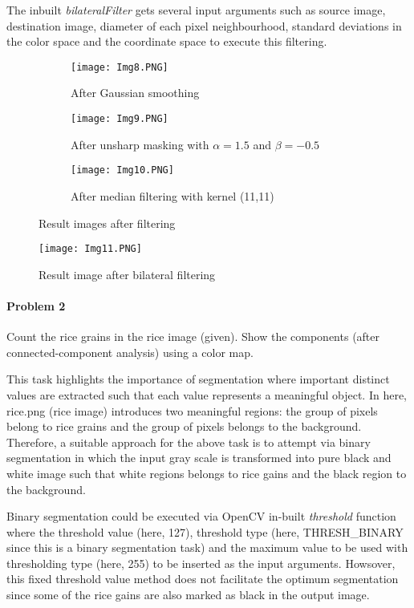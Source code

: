 \documentclass[11pt]{scrartcl}
\begin{document}
{\begin{enumerate}[label=(\alph*)]
The inbuilt \textit{bilateralFilter} gets several input arguments such as source image, destination image, diameter of each pixel neighbourhood, standard deviations in the color space and the coordinate space to execute this filtering.
\begin{figure}
\centering
\begin{subfigure}{.5\textwidth}
  \centering
  \texttt{[image: Img8.PNG]}
  \caption{After Gaussian smoothing}
  \label{fig:sub1}
\end{subfigure}%
\begin{subfigure}{0.5\textwidth}
  \centering
  \texttt{[image: Img9.PNG]}
  \caption{After unsharp masking with $\alpha = 1.5$ and $\beta = -0.5$}
  \label{fig:sub2}
\end{subfigure}
\begin{subfigure}{0.5\textwidth}
  \centering
  \texttt{[image: Img10.PNG]}
  \caption{After median filtering with kernel (11,11)}
  \label{fig:sub2}
\end{subfigure}
\caption{Result images after filtering}
\label{fig:test}
\end{figure}
\end{enumerate}

\begin{figure}[h!]
    \centering
    \texttt{[image: Img11.PNG]}
    \caption{Result image after bilateral filtering}
    \label{fig: PaleBlueDot}    
\end{figure}


\paragraph*{Problem 2}
Count the rice grains in the rice image (given). Show the components (after connected-component analysis) using a color map.

This task highlights the importance of segmentation where important distinct values are extracted such that each value represents a meaningful object. In here, rice.png (rice image) introduces two meaningful regions: the group of pixels belong to rice grains and the group of pixels belongs to the background. Therefore, a suitable approach for the above task is to attempt via binary segmentation in which the input gray scale is transformed into pure black and white image such that white regions belongs to rice gains and the black region to the background.

Binary segmentation could be executed via OpenCV in-built \textit{threshold} function where the threshold value (here, 127), threshold type (here, THRESH\_BINARY since this is a binary segmentation task) and the maximum value to be used with thresholding type (here, 255) to be inserted as the input arguments. Howsover, this fixed threshold value method does not facilitate the optimum segmentation since some of the rice gains are also marked as black in the output image. 

}
\end{document}
